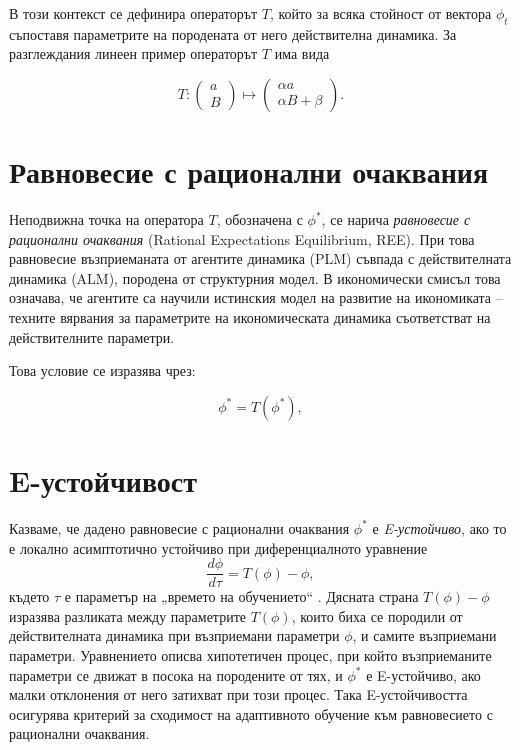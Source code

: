 В този контекст се дефинира операторът $T$, който за всяка стойност от вектора $\phi_t$ съпоставя параметрите на породената от него действителна динамика. За разглеждания линеен пример операторът $T$ има вида

\begin{equation} T:
\begin{pmatrix} a\\ B \end{pmatrix} \mapsto
\begin{pmatrix} \alpha a\\ \alpha B + \beta \end{pmatrix}. 
\label{eq:T_mapping} 
\end{equation} 

\section{Равновесие с рационални очаквания}

Неподвижна точка на оператора $T$, обозначена с $\phi^{\ast}$, се нарича \emph{равновесие с рационални очаквания} (Rational Expectations Equilibrium, REE). При това равновесие възприеманата от агентите динамика (PLM) съвпада с действителната динамика (ALM), породена от структурния модел. В икономически смисъл това означава, че агентите са научили истинския модел на развитие на икономиката -- техните вярвания за параметрите на икономическата динамика съответстват на действителните параметри.

Това условие се изразява чрез:

\begin{equation}
\phi^{\ast} = T(\phi^{\ast}),
\label{eq:T_fixed_point}
\end{equation}

\section{E-устойчивост}

Казваме, че дадено равновесие с рационални очаквания $\phi^*$ е 
\emph{E-устойчиво}, ако то е локално асимптотично устойчиво при 
диференциалното уравнение
\begin{equation}
\frac{d\phi}{d\tau} = T(\phi) - \phi,
\label{eq:E_dynamic}
\end{equation}
където $\tau$ е параметър на „времето на обучението“ \parencite[с. 31]{GeorgeEvans_2001}. Дясната страна $T(\phi) - \phi$ изразява разликата между параметрите $T(\phi)$, които биха се породили от действителната динамика при възприемани параметри $\phi$, и самите възприемани параметри. Уравнението описва хипотетичен процес, при който възприеманите параметри се движат в посока на породените от тях, и $\phi^*$ е E-устойчиво, ако малки отклонения от него затихват при този процес. Така E-устойчивостта осигурява критерий за сходимост на адаптивното обучение към равновесието с рационални очаквания.

